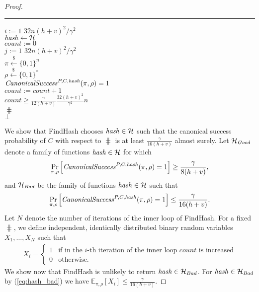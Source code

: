 \begin{proof}
\begin{codeblock}
  \medskip\hrule\medskip
  \For $i := 1$ \To $32n(h+v)^2/\gamma^2$ \Do \\
  \IndI $\operatorname{\mathit{hash}} \leftarrow{} \mathcal{H}$ \\
  \IndI $\mathit{count} := 0$ \\
  \IndI \For $j := 1$ \To $32n(h+v)^2/\gamma^2$ \Do \\
  \IndII $\pi \xleftarrow{\$} \{0,1\}^{n} $\\
  \IndII $\rho \xleftarrow{\$} \{0,1\}^*$ \\
  \IndII \If $\operatorname{\mathit{CanonicalSuccess}}^{P, C, \operatorname{\mathit{hash}}}(\pi, \rho) = 1$ \Then \\
  \IndIII $\mathit{count} := \mathit{count} + 1$\\
  \IndI \If $\mathit{count} \geq \frac{\gamma}{12(h+v)} \frac{32(h+v)^2}{\gamma^2}n$ \Then \\
  \IndII \Return $\hash$\\
  \Return $\bot$
\end{codeblock}
We show that FindHash chooses $\operatorname{\mathit{hash}} \in \mathcal{H}$ such that the canonical success probability of $C$
with respect to $\hash$ is at least $\frac{\gamma}{16(h+v)}$ almost surely.
Let $\mathcal{H}_{\mathit{Good}}$ denote a family of functions $\operatorname{\mathit{hash}} \in \mathcal{H}$ for which
\begin{align}
  \label{eq:hash_good}
\underset{\pi, \rho}{\Pr}\left[\operatorname{\mathit{CanonicalSuccess}}^{P, C, \operatorname{\mathit{hash}}}(\pi, \rho) = 1\right] \geq \frac{\gamma}{8(h+v)},
\end{align}
and $\mathcal{H}_{\mathit{Bad}}$ be the family of functions $\operatorname{\mathit{hash}} \in \mathcal{H}$ such that
\begin{align}
  \label{eq:hash_bad}
    \underset{\pi, \rho}{\Pr}\left[\operatorname{\mathit{CanonicalSuccess}}^{P, C, \operatorname{\mathit{hash}}}(\pi, \rho) = 1\right] \leq \frac{\gamma}{16(h+v)}.
    \end{align}
%
Let $N$ denote the number of iterations of the inner loop of FindHash.
For a fixed $\hash$, we define independent, identically distributed binary random variables $X_1, \dots, X_{N}$ such that
\begin{align*}
  X_i =
  \begin{cases}
    1 & \text{if in the $i$-th iteration of the inner loop $\mathit{count}$ is increased}\\
    0 & \text{otherwise.}
  \end{cases}
\end{align*}
We show now that FindHash is unlikely to return $\operatorname{\mathit{hash}} \in \mathcal{H}_{Bad}$.
For $\operatorname{\mathit{hash}} \in \mathcal{H}_{\mathit{Bad}}$ by (\ref{eq:hash_bad}) we have $\mathbb{E}_{{\pi}, \rho}[X_i] \leq \frac{\gamma}{16(h+v)}$.

\end{proof}
